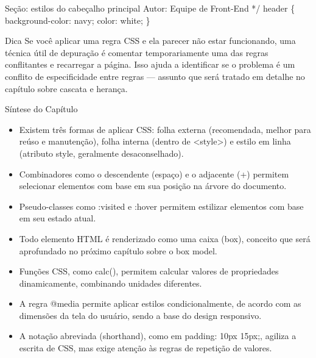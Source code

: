 \begin{infobox}{Seção: estilos do cabeçalho principal}
Autor: Equipe de Front-End */ header \{ background-color: navy; color: white; \}
\end{infobox}

\begin{infobox}{Dica}
Se você aplicar uma regra CSS e ela parecer não estar funcionando, uma técnica útil de depuração é comentar temporariamente uma das regras conflitantes e recarregar a página. Isso ajuda a identificar se o problema é um conflito de especificidade entre regras — assunto que será tratado em detalhe no capítulo sobre cascata e herança.
\end{infobox}

Síntese do Capítulo

\begin{itemize}
  \item Existem três formas de aplicar CSS: folha externa (recomendada, melhor para reúso e manutenção), folha interna (dentro de <style>) e estilo em linha (atributo style, geralmente desaconselhado).
\end{itemize}

\begin{itemize}
  \item Combinadores como o descendente (espaço) e o adjacente (+) permitem selecionar elementos com base em sua posição na árvore do documento.
\end{itemize}

\begin{itemize}
  \item Pseudo-classes como :visited e :hover permitem estilizar elementos com base em seu estado atual.
\end{itemize}

\begin{itemize}
  \item Todo elemento HTML é renderizado como uma caixa (box), conceito que será aprofundado no próximo capítulo sobre o box model.
\end{itemize}

\begin{itemize}
  \item Funções CSS, como calc(), permitem calcular valores de propriedades dinamicamente, combinando unidades diferentes.
\end{itemize}

\begin{itemize}
  \item A regra @media permite aplicar estilos condicionalmente, de acordo com as dimensões da tela do usuário, sendo a base do design responsivo.
\end{itemize}

\begin{itemize}
  \item A notação abreviada (shorthand), como em padding: 10px 15px;, agiliza a escrita de CSS, mas exige atenção às regras de repetição de valores.
\end{itemize}
